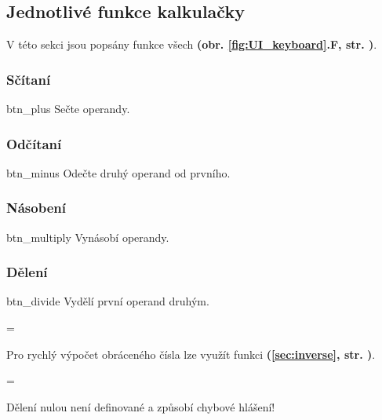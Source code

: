 \documentclass[a5paper,8pt,twoside]{extarticle}
\newenvironment{infoBox}
  {\par\begin{mdframed}[linewidth=1pt,linecolor=black]%
    \begin{list}{}{\leftmargin=1cm
                   \labelwidth=\leftmargin}\item[\Large\lefthand]}
  {\end{list}\end{mdframed}\par}
\newenvironment{prohibitBox}
  {\par\begin{mdframed}[linewidth=1pt,linecolor=black]%
    \begin{list}{}{\leftmargin=1cm
                   \labelwidth=\leftmargin}\item[\Large\noway]}
  {\end{list}\end{mdframed}\par}
\newenvironment{function_reference}[1]
   {\par
    \begin{list}{}{\leftmargin=1cm
                   \labelwidth=\leftmargin}\item[{\raisebox{-0.5\baselineskip}{\texttt{[image: \#1]}}}]}
  {\end{list}\par}
\newcommand*\joinBox{\vspace{-0.9em}}
\newcommand*\nref[1]{\textbf{(\ref{#1}, str. \pageref{#1})}}
\newcommand*\fref[2]{\textbf{(obr. \ref{#1}#2, str. \pageref{#1})}}
\begin{document}
    \renewcommand\thesubsubsection{\thesubsection.\arabic{subsubsection}}
    \subsection{Jednotlivé funkce kalkulačky}
    \label{sec:function_reference}
    V této sekci jsou popsány funkce všech  \fref{fig:UI_keyboard}{.F}.

    \subsubsection{Sčítaní}
    \label{sec:addition}
    \begin{function_reference}{btn_plus}
        Sečte operandy.
    \end{function_reference}
    
    \subsubsection{Odčítaní}
    \label{sec:subtraction}
    \begin{function_reference}{btn_minus}
        Odečte druhý operand od prvního.
    \end{function_reference}

    \subsubsection{Násobení}
    \label{sec:multiply}
    \begin{function_reference}{btn_multiply}
        Vynásobí operandy.
    \end{function_reference}

    \subsubsection{Dělení}
    \label{sec:division}
    \begin{function_reference}{btn_divide}
        Vydělí první operand druhým.
        \begin{infoBox}
            Pro rychlý výpočet obráceného čísla lze využít funkci  \nref{sec:inverse}.
        \end{infoBox}
        \joinBox
        \begin{prohibitBox}
            Dělení nulou není definované a způsobí chybové hlášení!
        \end{prohibitBox}
    \end{function_reference}
\end{document}
